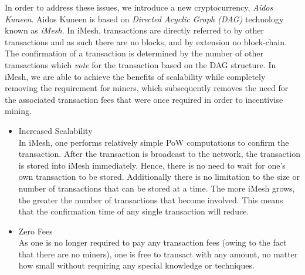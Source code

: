 \documentclass[a4paper,10pt,twocolumn]{article}
\begin{document}
In order to address these issues, we introduce a new cryptocurrency, \emph{Aidos Kuneen}.
Aidos Kuneen is based on \emph{Directed Acyclic Graph (DAG)} technology known as \emph{iMesh}.
In iMesh, transactions are directly referred to by other transactions and as such there are no blocks, and by extension no block-chain.
The confirmation of a transaction is determined by the number of other transactions which \emph{vote} for the transaction based on the
DAG structure. In iMesh, we are able to achieve the benefits of scalability while completely removing the requirement for miners, which subsequently removes the need for the associated transaction fees that were once required in order to incentivise mining.
\vspace{-0.5\baselineskip}
\begin{itemize}
	\setlength\itemsep{0em}
	\item{Increased Scalability}\mbox{}\\ 
In iMesh, one performs relatively simple PoW computations to confirm the transaction. After the transaction is broadcast to the network,
the transaction is stored into iMesh immediately. Hence, there is no need to wait for one's own transaction to be stored. Additionally 
there is no limitation to the size or number of transactions that can be stored at a time. The more iMesh grows, the greater the number 
of transactions that become involved. This means that the confirmation time of any single transaction will reduce.

\item{Zero Fees}\mbox{}\\ 
As one is no longer required to pay any transaction fees (owing to the fact that there are no miners), one is free to 
transact with any amount, no matter how small without requiring any special knowledge or techniques.


\end{itemize}
\end{document}
